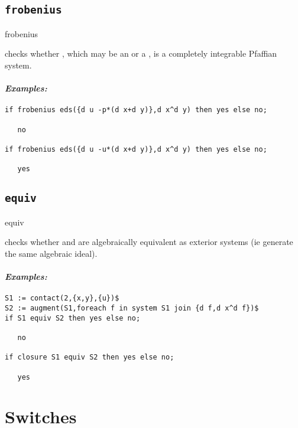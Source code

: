 \subsection{\tt frobenius}
\label{frobenius}

\begin{syntax}
	frobenius 
\end{syntax}
checks whether , which may be an  or a ,
is a completely integrable Pfaffian system.

\paragraph{\it Examples:}
\begin{verbatim}
if frobenius eds({d u -p*(d x+d y)},d x^d y) then yes else no;

   no

if frobenius eds({d u -u*(d x+d y)},d x^d y) then yes else no;

   yes
\end{verbatim}

\subsection{\tt equiv}
\label{equiv}

\begin{syntax}
	 equiv 
\end{syntax}
checks whether  and  are algebraically equivalent as
exterior systems (ie generate the same algebraic ideal).

\paragraph{\it Examples:}
\begin{verbatim}
S1 := contact(2,{x,y},{u})$
S2 := augment(S1,foreach f in system S1 join {d f,d x^d f})$
if S1 equiv S2 then yes else no;

   no 

if closure S1 equiv S2 then yes else no;

   yes 
\end{verbatim}




\section{Switches}
\label{Switches}

